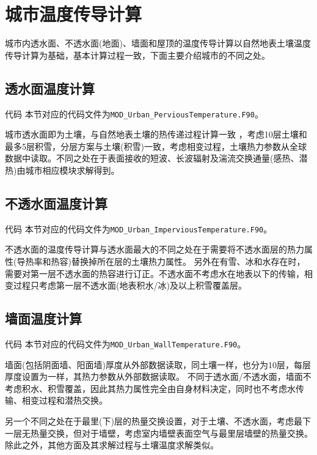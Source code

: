 \section{城市温度传导计算}
城市内透水面、不透水面(地面)、墙面和屋顶的温度传导计算以自然地表土壤温度传导计算为基础，基本计算过程一致，下面主要介绍城市的不同之处。

\subsection{透水面温度计算}
\begin{mymdframed}{代码}
本节对应的代码文件为\texttt{MOD\_Urban\_PerviousTemperature.F90}。
\end{mymdframed}

城市透水面即为土壤，与自然地表土壤的热传递过程计算一致 ，考虑10层土壤和最多5层积雪，分层方案与土壤(积雪)一致，考虑相变过程，土壤热力参数从全球数据中读取。不同之处在于表面接收的短波、长波辐射及湍流交换通量(感热、潜热)由城市相应模块求解得到。

\subsection{不透水面温度计算}
\begin{mymdframed}{代码}
本节对应的代码文件为\texttt{MOD\_Urban\_ImperviousTemperature.F90}。
\end{mymdframed}

不透水面的温度传导计算与透水面最大的不同之处在于需要将不透水面层的热力属性(导热率和热容)替换掉所在层的土壤热力属性。
另外在有雪、冰和水存在时，需要对第一层不透水面的热容进行订正。不透水面不考虑水在地表以下的传输，相变过程只考虑第一层不透水面(地表积水/冰)及以上积雪覆盖层。

\subsection{墙面温度计算}

\begin{mymdframed}{代码}
本节对应的代码文件为\texttt{MOD\_Urban\_WallTemperature.F90}。
\end{mymdframed}

墙面(包括阴面墙、阳面墙)厚度从外部数据读取，同土壤一样，也分为10层，每层厚度设置为一样，其热力参数从外部数据读取。
不同于透水面/不透水面，墙面不考虑积水、积雪覆盖，因此其热力属性完全由自身材料决定，同时也不考虑水传输、相变过程和潜热交换。

另一个不同之处在于最里(下)层的热量交换设置，对于土壤、不透水面，考虑最下一层无热量交换，但对于墙壁，考虑室内墙壁表面空气与最里层墙壁的热量交换。除此之外，其他方面及其求解过程与土壤温度求解类似。


